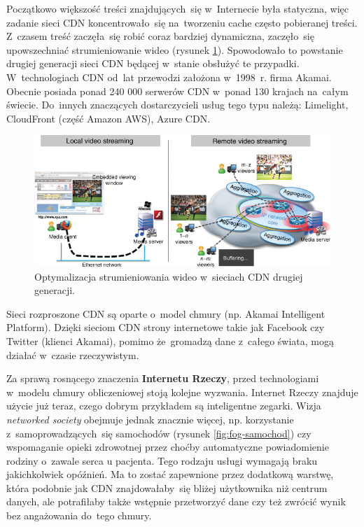 \documentclass[12pt,a4paper,twoside,titlepage,openright]{book}
\begin{document}
Początkowo większość treści znajdujących~się w~Internecie była statyczna, więc zadanie sieci CDN koncentrowało~się na~tworzeniu cache często pobieranej treści. Z~czasem treść zaczęła~się robić coraz bardziej dynamiczna, zaczęło~się upowszechniać strumieniowanie wideo (rysunek \ref{fig:cdn-streaming}). Spowodowało to powstanie drugiej generacji sieci CDN będącej w~stanie obsłużyć te przypadki. W~technologiach CDN od~lat przewodzi założona w~1998~r. firma Akamai. Obecnie posiada ponad 240 000 serwerów CDN w~ponad 130 krajach na~całym świecie.\cite{siteAkamaiFacts} Do~innych znaczących dostarczycieli usług tego typu należą: Limelight, CloudFront (część Amazon AWS), Azure CDN. \cite{ccCambridge, cdn}

\begin{figure}[h]
	\centering
			\includegraphics[resolution=120]{cdn-streaming.jpg}
		\caption{Optymalizacja strumieniowania wideo w~sieciach CDN drugiej generacji. \cite{cdn}}
		\label{fig:cdn-streaming}
\end{figure}


Sieci rozproszone CDN są oparte o~model chmury (np. Akamai Intelligent Platform). Dzięki sieciom CDN strony internetowe takie jak Facebook czy Twitter (klienci Akamai), pomimo że~gromadzą dane z~całego świata, mogą działać w~czasie rzeczywistym. \cite{ccCambridge}

Za sprawą rosnącego znaczenia \textbf{Internetu Rzeczy}, przed technologiami w~modelu chmury obliczeniowej stoją kolejne wyzwania. Internet Rzeczy znajduje użycie już teraz, czego dobrym przykładem są inteligentne zegarki. Wizja \textit{networked society} obejmuje jednak znacznie więcej, np. korzystanie z~samoprowadzących~się samochodów (rysunek \ref{fig:fog-samochod}) czy wspomaganie opieki zdrowotnej przez choćby automatyczne powiadomienie rodziny o~zawale serca u pacjenta. Tego rodzaju usługi wymagają braku jakichkolwiek opóźnień. Ma to zostać zapewnione przez dodatkową warstwę, która podobnie jak CDN znajdowałaby~się bliżej użytkownika niż centrum danych, ale potrafiłaby także wstępnie przetworzyć dane czy też zwrócić wynik bez angażowania do~tego chmury.
\end{document}
